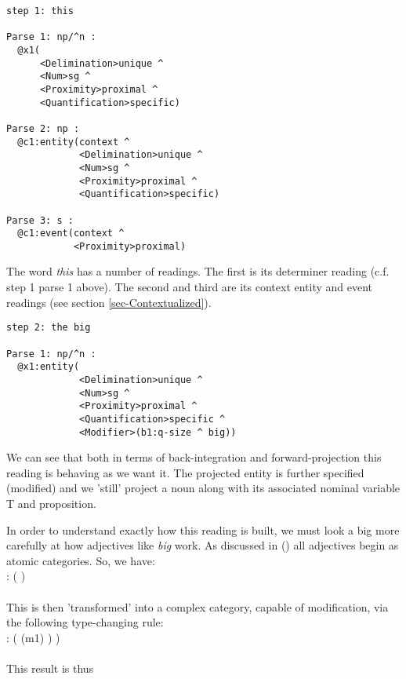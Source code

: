 \begin{verbatim}
step 1: this        

Parse 1: np/^n : 
  @x1(
      <Delimination>unique ^ 
      <Num>sg ^ 
      <Proximity>proximal ^ 
      <Quantification>specific)
      
Parse 2: np : 
  @c1:entity(context ^ 
             <Delimination>unique ^ 
             <Num>sg ^ 
             <Proximity>proximal ^ 
             <Quantification>specific)

Parse 3: s : 
  @c1:event(context ^ 
            <Proximity>proximal)
\end{verbatim}      
The word \emph{this} has a number of readings. The first is its determiner reading (c.f. step 1 parse 1 above). The second and third are its context entity and event readings (see section \ref{sec-Contextualized}). 
\begin{verbatim}
step 2: the big   

Parse 1: np/^n : 
  @x1:entity(
             <Delimination>unique ^ 
             <Num>sg ^ 
             <Proximity>proximal ^ 
             <Quantification>specific ^ 
             <Modifier>(b1:q-size ^ big))
\end{verbatim} 
We can see that both in terms of back-integration and forward-projection this reading is behaving as we want it. The projected entity is further specified (modified) and we 'still' project a noun along with its associated nominal variable T and proposition. 

In order to understand exactly how this reading is built, we must look a big more carefully at how adjectives like \emph{big} work. As discussed in () all adjectives begin as atomic categories. So, we have:\\

   :   ( ) \\ \\
This is then 'transformed' into a complex category, capable of modification, 
via the following type-changing rule:\\

   \arrow {}  : (  (m1) ) ) \\ \\
This result is thus \\

